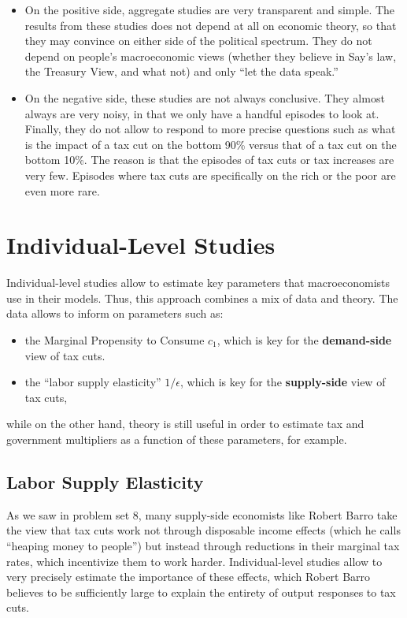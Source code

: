 \documentclass[]{book}
\begin{document}
\begin{itemize}
\item
  On the positive side, aggregate studies are very transparent and
  simple. The results from these studies does not depend at all on
  economic theory, so that they may convince on either side of the
  political spectrum. They do not depend on people's macroeconomic views
  (whether they believe in Say's law, the Treasury View, and what not)
  and only ``let the data speak.''
\item
  On the negative side, these studies are not always conclusive. They
  almost always are very noisy, in that we only have a handful episodes
  to look at. Finally, they do not allow to respond to more precise
  questions such as what is the impact of a tax cut on the bottom 90\%
  versus that of a tax cut on the bottom 10\%. The reason is that the
  episodes of tax cuts or tax increases are very few. Episodes where tax
  cuts are specifically on the rich or the poor are even more rare.
\end{itemize}

\section{Individual-Level Studies}\label{individual-level-studies}

Individual-level studies allow to estimate key parameters that
macroeconomists use in their models. Thus, this approach combines a mix
of data and theory. The data allows to inform on parameters such as:

\begin{itemize}
\item
  the Marginal Propensity to Consume \(c_1\), which is key for the
  \textbf{demand-side} view of tax cuts.
\item
  the ``labor supply elasticity'' \(1/\epsilon\), which is key for the
  \textbf{supply-side} view of tax cuts,
\end{itemize}

while on the other hand, theory is still useful in order to estimate tax
and government multipliers as a function of these parameters, for
example.

\subsection{Labor Supply Elasticity}\label{labor-supply-elasticity}

As we saw in problem set 8, many supply-side economists like Robert
Barro take the view that tax cuts work not through disposable income
effects (which he calls ``heaping money to people'') but instead through
reductions in their marginal tax rates, which incentivize them to work
harder. Individual-level studies allow to very precisely estimate the
importance of these effects, which Robert Barro believes to be
sufficiently large to explain the entirety of output responses to tax
cuts.
\end{document}
